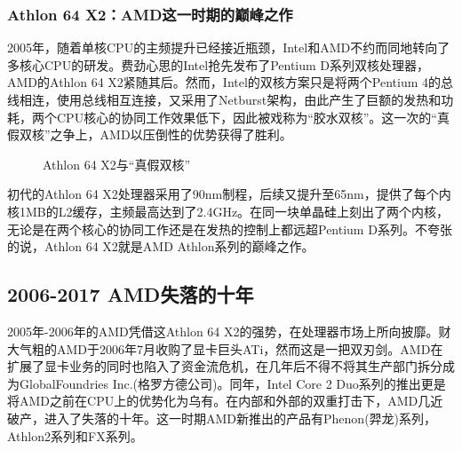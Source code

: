 \documentclass[UTF8]{ctexart}
\begin{document}
\subsubsection{Athlon 64 X2：AMD这一时期的巅峰之作}
2005年，随着单核CPU的主频提升已经接近瓶颈，Intel和AMD不约而同地转向了多核心CPU的研发。费劲心思的Intel抢先发布了Pentium D系列双核处理器，AMD的Athlon 64 X2紧随其后。然而，Intel的双核方案只是将两个Pentium 4的总线相连，使用总线相互连接，又采用了Netburst架构，由此产生了巨额的发热和功耗，两个CPU核心的协同工作效果低下，因此被戏称为“胶水双核”。这一次的“真假双核”之争上，AMD以压倒性的优势获得了胜利。
\begin{figure}[H]
    \centering
    \caption{Athlon 64 X2与“真假双核”}
\end{figure}

初代的Athlon 64 X2处理器采用了90nm制程，后续又提升至65nm，提供了每个内核1MB的L2缓存，主频最高达到了2.4GHz。在同一块单晶硅上刻出了两个内核，无论是在两个核心的协同工作还是在发热的控制上都远超Pentium D系列。不夸张的说，Athlon 64 X2就是AMD Athlon系列的巅峰之作。

\subsection{2006-2017 AMD失落的十年}
2005年-2006年的AMD凭借这Athlon 64 X2的强势，在处理器市场上所向披靡。财大气粗的AMD于2006年7月收购了显卡巨头ATi，然而这是一把双刃剑。AMD在扩展了显卡业务的同时也陷入了资金流危机，在几年后不得不将其生产部门拆分成为GlobalFoundries Inc.(格罗方德公司)。同年，Intel Core 2 Duo系列的推出更是将AMD之前在CPU上的优势化为乌有。在内部和外部的双重打击下，AMD几近破产，进入了失落的十年。这一时期AMD新推出的产品有Phenon(羿龙)系列，Athlon2系列和FX系列。
\end{document}
